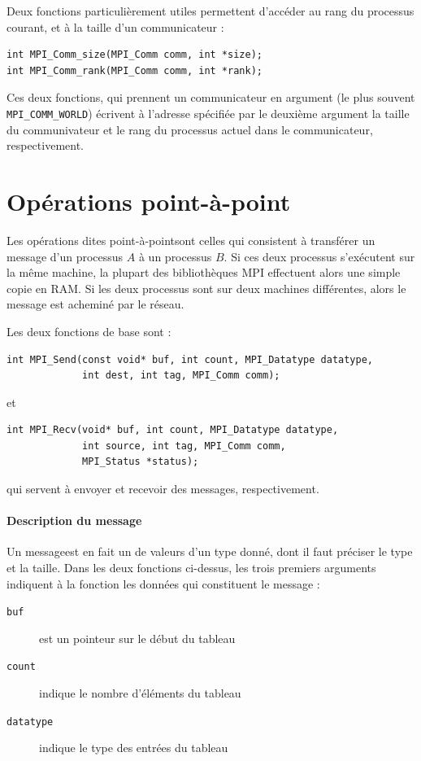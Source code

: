 Deux fonctions particulièrement utiles permettent d'accéder au rang du
processus courant, et à la taille d'un communicateur :
\begin{verbatim}
int MPI_Comm_size(MPI_Comm comm, int *size);
int MPI_Comm_rank(MPI_Comm comm, int *rank);
\end{verbatim}

Ces deux fonctions, qui prennent un communicateur en argument (le plus
souvent \verb|MPI_COMM_WORLD|) écrivent à l'adresse spécifiée par le
deuxième argument la taille du communivateur et le rang du processus
actuel dans le communicateur, respectivement.

\section{Opérations point-à-point}

Les opérations dites \og point-à-point\fg sont celles qui consistent à
transférer un message d'un processus $A$ à un processus $B$. Si ces
deux processus s'exécutent sur la même machine, la plupart des
bibliothèques MPI effectuent alors une simple copie en RAM. Si les deux
processus sont sur deux machines différentes, alors le message est
acheminé par le réseau.

Les deux fonctions de base sont :
\begin{verbatim}
int MPI_Send(const void* buf, int count, MPI_Datatype datatype,
             int dest, int tag, MPI_Comm comm);
\end{verbatim}
et
\begin{verbatim}
int MPI_Recv(void* buf, int count, MPI_Datatype datatype,
             int source, int tag, MPI_Comm comm,
             MPI_Status *status);
\end{verbatim}
qui servent à envoyer et recevoir des messages, respectivement.

\paragraph{Description du message} Un \og message\fg est en fait un
 de valeurs d'un type donné, dont il faut préciser le type et
la taille. Dans les deux fonctions ci-dessus, les trois premiers arguments
indiquent à la fonction les données qui constituent le message :
\begin{description}
\item[\texttt{buf}] est un pointeur sur le début du tableau
\item[\texttt{count}] indique le nombre d'éléments du tableau
\item[\texttt{datatype}] indique le type des entrées du tableau
\end{description}

